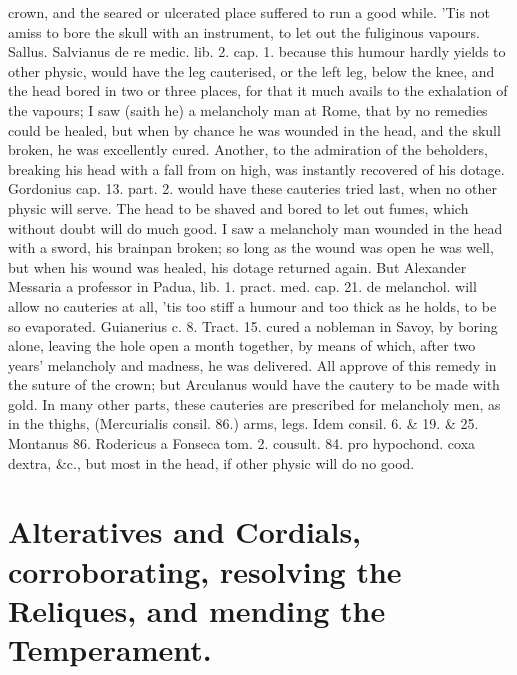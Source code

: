 crown, and the seared or ulcerated place suffered to run a good while.
'Tis not amiss to bore the skull with an instrument, to let out the
fuliginous vapours. Sallus. Salvianus de re medic. lib. 2. cap. 1.
because this humour hardly yields to other physic, would have the
leg cauterised, or the left leg, below the knee, and the head
bored in two or three places, for that it much avails to the exhalation
of the vapours;  I saw (saith he) a melancholy man at Rome, that
by no remedies could be healed, but when by chance he was wounded in
the head, and the skull broken, he was excellently cured. Another, to
the admiration of the beholders, breaking his head with a fall
from on high, was instantly recovered of his dotage. Gordonius cap. 13.
part. 2. would have these cauteries tried last, when no other physic
will serve.  The head to be shaved and bored to let out fumes,
which without doubt will do much good. I saw a melancholy man wounded
in the head with a sword, his brainpan broken; so long as the wound was
open he was well, but when his wound was healed, his dotage returned
again. But Alexander Messaria a professor in Padua, lib. 1. pract. med.
cap. 21. de melanchol. will allow no cauteries at all, 'tis too stiff a
humour and too thick as he holds, to be so evaporated.
Guianerius c. 8. Tract. 15. cured a nobleman in Savoy, by boring alone,
leaving the hole open a month together, by means of which, after
two years' melancholy and madness, he was delivered. All approve of
this remedy in the suture of the crown; but Arculanus would have the
cautery to be made with gold. In many other parts, these cauteries are
prescribed for melancholy men, as in the thighs, (Mercurialis consil.
86.) arms, legs. Idem consil. 6. \& 19. \& 25. Montanus 86. Rodericus a
Fonseca tom. 2. cousult. 84. pro hypochond. coxa dextra, \&c., but most
in the head, if other physic will do no good.

\section[Alternatives and Cordials]{Alteratives and Cordials, corroborating, resolving the Reliques, and mending the Temperament.}

